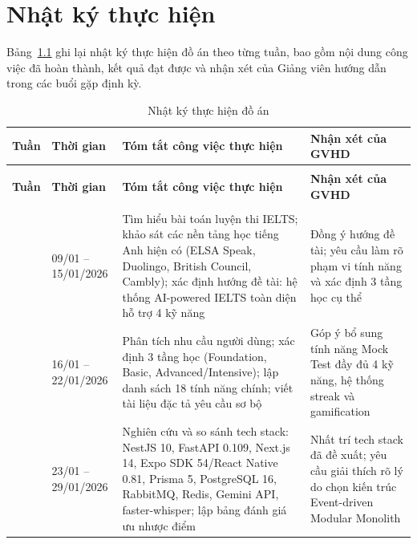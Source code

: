 \chapter{Nhật ký thực hiện}
\thispagestyle{appendixstyle}
\label{app:nhatky}

Bảng~\ref{tab:nhatky} ghi lại nhật ký thực hiện đồ án theo từng tuần, bao gồm nội dung công việc đã hoàn thành, kết quả đạt được và nhận xét của Giảng viên hướng dẫn trong các buổi gặp định kỳ.

\setlength{\tbu}{\dimexpr(\linewidth - 8\tabcolsep - 5\arrayrulewidth)/145\relax}
\begin{longtable}{|>{\centering\arraybackslash}p{15\tbu}|p{28\tbu}|p{62\tbu}|p{40\tbu}|}
    \caption{Nhật ký thực hiện đồ án} \label{tab:nhatky} \\
    \hline
    \textbf{Tuần} & \textbf{Thời gian} & \textbf{Tóm tắt công việc thực hiện} & \textbf{Nhận xét của GVHD} \\ \hline
    \endfirsthead
    \multicolumn{4}{r}{\footnotesize\textit{(tiếp theo)}} \\
    \hline
    \textbf{Tuần} & \textbf{Thời gian} & \textbf{Tóm tắt công việc thực hiện} & \textbf{Nhận xét của GVHD} \\ \hline
    \endhead
    \hline \multicolumn{4}{r}{\footnotesize\textit{(còn tiếp)}} \\
    \endfoot
    \endlastfoot
    1 & 09/01 -- 15/01/2026 & Tìm hiểu bài toán luyện thi IELTS; khảo sát các nền tảng học tiếng Anh hiện có (ELSA Speak, Duolingo, British Council, Cambly); xác định hướng đề tài: hệ thống AI-powered IELTS toàn diện hỗ trợ 4 kỹ năng & Đồng ý hướng đề tài; yêu cầu làm rõ phạm vi tính năng và xác định 3 tầng học cụ thể \\ \hline
    2 & 16/01 -- 22/01/2026 & Phân tích nhu cầu người dùng; xác định 3 tầng học (Foundation, Basic, Advanced/Intensive); lập danh sách 18 tính năng chính; viết tài liệu đặc tả yêu cầu sơ bộ & Góp ý bổ sung tính năng Mock Test đầy đủ 4 kỹ năng, hệ thống streak và gamification \\ \hline
    3 & 23/01 -- 29/01/2026 & Nghiên cứu và so sánh tech stack: NestJS 10, FastAPI 0.109, Next.js 14, Expo SDK 54/React Native 0.81, Prisma 5, PostgreSQL 16, RabbitMQ, Redis, Gemini API, faster-whisper; lập bảng đánh giá ưu nhược điểm & Nhất trí tech stack đã đề xuất; yêu cầu giải thích rõ lý do chọn kiến trúc Event-driven Modular Monolith \\ \hline

\end{longtable}
